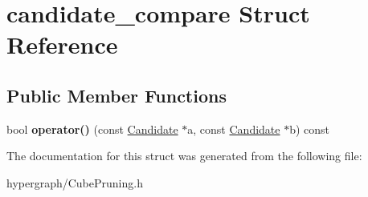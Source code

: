 \hypertarget{structcandidate__compare}{
\section{candidate\_\-compare Struct Reference}
\label{structcandidate__compare}
}
\subsection*{Public Member Functions}
\begin{DoxyCompactItemize}
\item 
\hypertarget{structcandidate__compare_ad142d42876f8dd88301ee5f1b3aed03b}{
bool {\bfseries operator()} (const \hyperlink{struct_candidate}{Candidate} $\ast$a, const \hyperlink{struct_candidate}{Candidate} $\ast$b) const }
\label{structcandidate__compare_ad142d42876f8dd88301ee5f1b3aed03b}

\end{DoxyCompactItemize}


The documentation for this struct was generated from the following file:\begin{DoxyCompactItemize}
\item 
hypergraph/CubePruning.h\end{DoxyCompactItemize}
